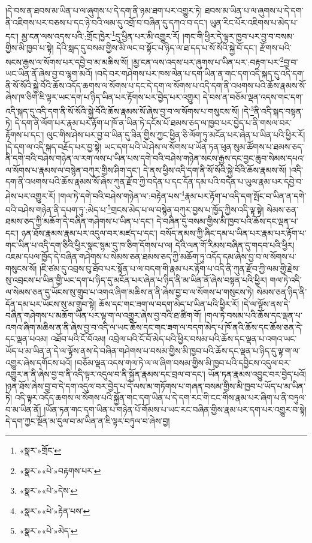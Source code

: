 །དེ་བས་ན་ཐབས་མ་ཡིན་པ་ལ་ཞུགས་པ་དེ་དག་ནི་ཉམ་ཐག་པར་འགྱུར་ཏེ། ཐབས་མ་ཡིན་པ་ལ་ཞུགས་པ་དེ་དག་ནི་འཇིགས་པར་བཅས་པ་དང་ཉེ་བའི་ལམ་དུ་འགྲོ་བ་བཞིན་དུ་དཀའ་བ་དང་། ཡུན་རིང་པོར་འཇིགས་པ་མེད་པ་དང་། མྱ་ངན་ལས་འདས་པའི་:གྲོང་ཁྱེར་\footnote{«སྣར་»གྲོང་}དུ་ཕྱིན་པར་མི་འགྱུར་རོ། །གང་གི་ཕྱིར་དེ་ལྟར་ཁྱབ་པར་བྱ་བ་བསམ་གྱིས་མི་ཁྱབ་པ་སྟེ། དེའི་སླད་དུ་བསམ་གྱིས་མི་ལང་བ་སྟོང་པ་ཉིད་ལ་ཐ་དད་པ་སོ་སོའི་སྐྱེ་བོ་དང་། རྫོགས་པའི་སངས་རྒྱས་ལ་སོགས་པར་དབྱེ་བ་མ་མཆིས་སོ། །མྱ་ངན་ལས་འདས་པར་ཞུགས་པ་ཡིན་པར་:བརྟག་པར་\footnote{«སྣར་»«པེ་»བརྟགས་པར་}བྱ་བ་ཡང་ཡིན་ནོ་ཞེས་བྱ་བ་ལྷག་མའོ། །བདེ་བར་གཤེགས་པར་ཁས་ལེན་པ་དག་ཡིན་ན་གང་དག་འདི་སྐད་དུ་འདི་དག་ནི་སོ་སོའི་སྐྱེ་བོའི་ཆོས་འདོད་ཆགས་ལ་སོགས་པ་དང་དེ་དག་ལ་སོགས་པ་འདི་དག་ནི་འཕགས་པའི་ཆོས་རྣམས་སོ་ཞེས་ཁ་ཅིག་ཇི་ལྟར་ཡང་དག་པ་ཉིད་ཡིན་པར་རྟོགས་པར་བྱེད་པར་འགྱུར། དེ་བས་ན་བཅོམ་ལྡན་འདས་གང་དག་འདི་སྐད་དུ་འདི་དག་ནི་སོ་སོའི་སྐྱེ་བོའི་ཆོས་རྣམས་སོ་ཞེས་བྱ་བ་ལ་སོགས་པ་གསུངས་སོ། །དེ་\footnote{«སྣར་»«པེ་»དེས་}ནི་འདི་སྐད་བསྟན་ཏེ། དེ་དག་ནི་ལོག་པར་རྣམ་པར་རྟོག་པ་ཁོ་ན་ཡིན་ཏེ་དངོས་པོ་ཐམས་ཅད་ལ་ཁྱབ་པར་བྱེད་པ་ནི་གསལ་བར་རྟོགས་པ་དང་། ལུང་གིས་ཤེས་པར་བྱ་བ་ཡིན་དུ་ཟིན་གྱིས་ཀྱང་ཕྱིན་ཅི་ལོག་ཏུ་མངོན་པར་ཞེན་པ་ཡིན་པའི་ཕྱིར་རོ། །དེ་དག་ལ་འདི་སྐད་བརྗོད་པར་བྱ་སྟེ། ཡང་དག་པའི་ཡེ་ཤེས་ལ་སོགས་པ་ཡོན་ཏན་ཕུན་སུམ་ཚོགས་པ་ཐམས་ཅད་ནི་དགེ་བའི་བཤེས་གཉེན་ལ་རག་ལས་པ་ཡིན་པས་དགེ་བའི་བཤེས་གཉེན་སངས་རྒྱས་དང་བྱང་ཆུབ་སེམས་དཔའ་ལ་སོགས་པ་རྣམས་ལ་བསྙེན་བཀུར་གྱིས་ཤིག་དང་། དེ་ནས་ཕྱིས་འདི་དག་ནི་སོ་སོའི་སྐྱེ་བོའི་ཆོས་རྣམས་སོ། །འདི་དག་ནི་འཕགས་པའི་ཆོས་རྣམས་སོ་ཞེས་ཀུན་རྫོབ་ཀྱི་བདེན་པ་དང་དོན་དམ་པའི་བདེན་པ་ཡུལ་རྣམ་པར་དབྱེ་བ་ཤེས་པར་འགྱུར་རོ། །གལ་ཏེ་དགེ་བའི་བཤེས་གཉེན་ལ་:བརྟེན་པས་\footnote{«སྣར་»«པེ་»རྟེན་པས་}རྣམ་པར་རྟོག་པ་འདི་དག་སྤོང་བ་ཡིན་ན་དགེ་བའི་བཤེས་གཉེན་ནི་དཔག་ཏུ་:མེད་པ་\footnote{«སྣར་»«པེ་»མེད་}གྲངས་མེད་པ་ལ་བསྙེན་བཀུར་བྱས་པ་ཁྱོད་ཀྱིས་འདི་ལྟ་སྟེ། སེམས་ཅན་ཐམས་ཅད་ཀྱི་མཆོག་དེ་བཞིན་གཤེགས་པ་ཡིན་པ་དང་། དེ་བཞིན་དུ་བསམ་གྱིས་མི་ཁྱབ་པའི་ཆོས་དང་ལྡན་པ་དང་། ཉན་ཐོས་རྣམས་རྣམ་པར་འདུལ་བར་མཛད་པ་དང་། བསོད་ནམས་ཀྱི་ཞིང་དམ་པ་ཡིན་པར་རྣམ་པར་རྟོག་པ་གང་ཡིན་པ་འདི་དག་ཅིའི་ཕྱིར་སྣང་སྙམ་དུ་ཁ་ཅིག་དོགས་པ་ལ། དེའི་ལན་གོ་རིམས་བཞིན་དུ་གདབ་པའི་ཕྱིར། འཇམ་དཔལ་ཁྱོད་དེ་བཞིན་གཤེགས་པ་སེམས་ཅན་ཐམས་ཅད་ཀྱི་མཆོག་ཏུ་འདོད་དམ་ཞེས་བྱ་བ་ལ་སོགས་པ་གསུངས་སོ། །ཇི་ཙམ་དུ་འབྲས་བུ་ཐོབ་པར་སྟོན་པ་ལ་བདག་གི་རྣམ་པར་རྟོག་པ་འདི་ནི་ཀུན་རྫོབ་ཀྱི་ལམ་གྱི་རྗེས་སུ་འབྲངས་པ་ཡིན་གྱི་ཡང་དག་པ་ཉིད་དུ་མངོན་པར་ཞེན་པ་ཉིད་ནི་མ་ཡིན་ནོ་ཞེས་བསྟན་པའི་ཕྱིར། གལ་ཏེ་འདི་ལ་སེམས་ཅན་དུ་ཡོངས་སུ་གྲུབ་པ་འགའ་ཞིག་མཆིས་ན་ནི་ཞེས་བྱ་བ་ལ་སོགས་པ་གསུངས་ཏེ། སེམས་ཅན་ཉིད་ནི་དོན་དམ་པར་ཡོངས་སུ་མ་གྲུབ་སྟེ། ཆོས་དང་གང་ཟག་ལ་བདག་མེད་པ་ཡིན་པའི་ཕྱིར་རོ། །དེ་ལ་ལྟོས་ནས་དེ་བཞིན་གཤེགས་པ་མཆོག་ཡིན་པར་ལྟ་ག་ལ་འགྱུར་ཞེས་བྱ་བའི་ཐ་ཚིག་གོ། །གལ་ཏེ་བསམ་པའི་ཆོས་དང་ལྡན་པ་འགའ་ཞིག་མཆིས་ན་ནི་ཞེས་བྱ་བ་འདི་ལ་ཡང་ཆོས་དང་གང་ཟག་ལ་བདག་མེད་པ་ཁོ་ནའི་ཆོས་དང་ཆོས་ཅན་དེ་དང་ལྡན་པའམ། འཐོབ་པའི་ངོ་བོའམ། འབྲེལ་པའི་ངོ་བོ་མེད་པའི་ཕྱིར་བསམ་པའི་ཆོས་དང་ལྡན་པ་འགའ་ཡང་ཡོད་པ་མ་ཡིན་ན་དེ་ལ་ལྟོས་ནས་དེ་བཞིན་གཤེགས་པ་བསམ་གྱིས་མི་ཁྱབ་པའི་ཆོས་དང་ལྡན་པ་ཉིད་དུ་ལྟ་ག་ལ་འགྱུར་ཞེས་དགོངས་པའོ། །བཅོམ་ལྡན་འདས་གལ་ཏེ་ལ་ལ་ཞིག་བསམ་གྱིས་མི་ཁྱབ་པའི་དབྱིངས་འདུལ་བར་འགྱུར་ན་ནི་ཞེས་བྱ་བ་ནི་འདི་ལྟར་འདུལ་བ་ནི་སྐྱོན་རྣམས་དང་བྲལ་བ་དང་། ཡོན་ཏན་རྣམས་འབྱུང་བར་བྱེད་པའོ། །ཉན་ཐོས་ཞེས་བྱ་བ་དེ་དག་འདུལ་བར་བྱེད་པ་དེ་ལས་མ་གཏོགས་པ་གཞན་བསམ་གྱིས་མི་ཁྱབ་པ་ཡོད་པ་མ་ཡིན་ཏེ། འདི་ལྟར་འདོད་ཆགས་ལ་སོགས་པའི་སྐྱོན་གང་དག་ཡིན་པ་དེ་དག་རང་གི་ངང་གིས་རྣམ་པར་ཞིག་པ་ནི་བཏུལ་བ་མ་ཡིན་ནོ། །ཡོན་ཏན་གང་དག་ཡིན་པ་གཉེན་པོ་གོམས་པ་ཡང་རང་བཞིན་གྱིས་རྣམ་པར་དག་པར་འགྱུར་བ་སྟེ། དེ་དག་ཀྱང་སྔོན་མ་དུལ་བ་མ་ཡིན་ན་ཇི་ལྟར་བཏུལ་བ་ཞེས་བྱ། 